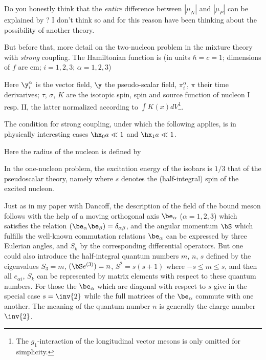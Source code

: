 Do you honestly think that the \textit{entire} difference between $|\mu_N|$ and $|\mu_P|$ can be explained by ? I don't think so and for this reason have been thinking about the possibility of another theory.

But before that, more detail on the two-nucleon problem in the mixture theory with \textit{strong} coupling. The Hamiltonian function is (in units $\hbar=c=1$; dimensions of $f$ are cm; $i=1,2,3$; $\alpha=1,2,3$)

Here $\y_i^\alpha$ is the vector field, $\y$ the pseudo-scalar field, $\pi_i^\alpha$, $\pi$ their time derivarives; $\tau$, $\sigma$, $K$ are the isotopic spin, spin and source function of nucleon I resp. II, the latter normalized according to $\int K(x){dV}$\footnote{The $g_1$-interaction of the longitudinal vector mesons is only omitted for simplicity.}.

The condition for strong coupling, under which the following applies, is in physically interesting cases $\hx_0 a \ll 1$ and $\hx_1 a \ll 1$.

Here the radius of the nucleon is defined by

In the one-nucleon problem, the excitation energy of the isobars is $1/3$ that of the pseudoscalar theory, namely
where $s$ denotes the (half-integral) spin of the excited nucleon.

Just as in my paper with Dancoff, the description of the field of the bound meson follows with the help of a moving orthogonal axis $\be_\alpha$ ($\alpha=1,2,3$) which satisfies the relation $(\be_\alpha \be_\beta)=\delta_{\alpha\beta}$, and the angular momentum $\bS$ which fulfills the well-known commutation relations
$\be_\alpha$ can be expressed by three Eulerian angles, and $S_k$ by the corresponding differential operators. But one could also introduce the half-integral quantum numbers $m$, $n$, $s$ defined by the eigenvalues $S_3=m$, $(\bS e^{(3)})=n$, $S^2 = s(s+1)$ where $-s \leq m \leq s$, and then all $e_{\alpha i}$, $S_k$ can be represented by matrix elements with respect to these quantum numbers. For those  the $\be_\alpha$ which are diagonal with respect to $s$ give in the special case $s=\inv{2}$
while the full matrices of the $\be_\alpha$ commute with one another. The meaning of the quantum number $n$ is generally the charge number $\inv{2}$.

